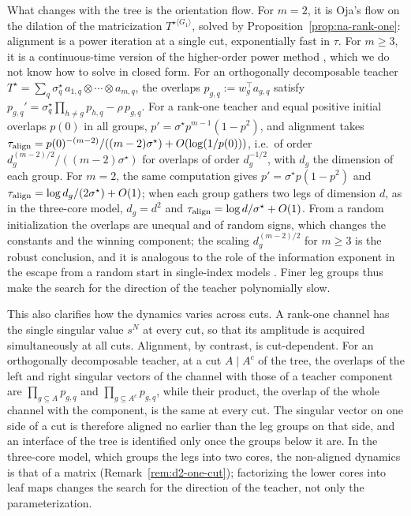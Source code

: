 \documentclass[11pt]{article}
\theoremstyle{definition}
\numberwithin{equation}{section}
\begin{document}
What changes with the tree is the orientation flow. For $m=2$, it is Oja's flow on the dilation of the matricization $T^{\star\langle G_1\rangle}$, solved by Proposition~\ref{prop:na-rank-one}: alignment is a power iteration at a single cut, exponentially fast in $\tau$. For $m\ge3$, it is a continuous-time version of the higher-order power method \citep{delathauwer2000best,anandkumar2014tensor}, which we do not know how to solve in closed form. For an orthogonally decomposable teacher $T^\star=\sum_q\sigma^\star_q\,a_{1,q}\otimes\cdots\otimes a_{m,q}$, the overlaps $p_{g,q}:=w_g^\top a_{g,q}$ satisfy $p_{g,q}'=\sigma^\star_q\prod_{h\neq g}p_{h,q}-\rho\,p_{g,q}$. For a rank-one teacher and equal positive initial overlaps $p(0)$ in all groups, $p'=\sigma^\star p^{m-1}(1-p^2)$, and alignment takes $\tau_{\rm align}=p(0)^{-(m-2)}/((m-2)\sigma^\star)+O(\log(1/p(0)))$, i.e.\ of order $d_g^{(m-2)/2}/((m-2)\sigma^\star)$ for overlaps of order $d_g^{-1/2}$, with $d_g$ the dimension of each group. For $m=2$, the same computation gives $p'=\sigma^\star p(1-p^2)$ and $\tau_{\rm align}=\log d_g/(2\sigma^\star)+O(1)$; when each group gathers two legs of dimension $d$, as in the three-core model, $d_g=d^2$ and $\tau_{\rm align}=\log d/\sigma^\star+O(1)$. From a random initialization the overlaps are unequal and of random signs, which changes the constants and the winning component; the scaling $d_g^{(m-2)/2}$ for $m\ge3$ is the robust conclusion, and it is analogous to the role of the information exponent in the escape from a random start in single-index models \citep{benarous2021online}. Finer leg groups thus make the search for the direction of the teacher polynomially slow.

This also clarifies how the dynamics varies across cuts. A rank-one channel has the single singular value $s^N$ at every cut, so that its amplitude is acquired simultaneously at all cuts. Alignment, by contrast, is cut-dependent. For an orthogonally decomposable teacher, at a cut $A\mid A^c$ of the tree, the overlaps of the left and right singular vectors of the channel with those of a teacher component are $\prod_{g\subseteq A}p_{g,q}$ and $\prod_{g\subseteq A^c}p_{g,q}$, while their product, the overlap of the whole channel with the component, is the same at every cut. The singular vector on one side of a cut is therefore aligned no earlier than the leg groups on that side, and an interface of the tree is identified only once the groups below it are. In the three-core model, which groups the legs into two cores, the non-aligned dynamics is that of a matrix (Remark~\ref{rem:d2-one-cut}); factorizing the lower cores into leaf maps changes the search for the direction of the teacher, not only the parameterization.
\end{document}
